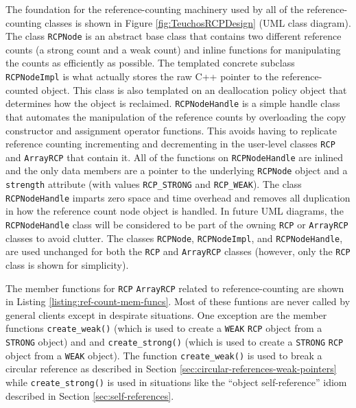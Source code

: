 \documentclass[pdf,ps2pdf,11pt]{SANDreport}
\begin{document}
The foundation for the reference-counting machinery used by all of the
reference-counting classes is shown in Figure
{}\ref{fig:TeuchosRCPDesign} (UML class diagram).  The class
{}\texttt{RCPNode} is an abstract base class that contains two
different reference counts (a strong count and a weak count) and
inline functions for manipulating the counts as efficiently as
possible.  The templated concrete subclass {}\texttt{RCPNodeImpl} is
what actually stores the raw C++ pointer to the reference-counted
object.  This class is also templated on an deallocation policy object
that determines how the object is reclaimed.  {}\texttt{RCPNodeHandle}
is a simple handle class that automates the manipulation of the
reference counts by overloading the copy constructor and assignment
operator functions.  This avoids having to replicate reference
counting incrementing and decrementing in the user-level classes
{}\texttt{RCP} and {}\texttt{ArrayRCP} that contain it.  All of the
functions on {}\texttt{RCPNodeHandle} are inlined and the only data
members are a pointer to the underlying {}\texttt{RCPNode} object and
a {}\texttt{strength} attribute (with values {}\texttt{RCP\_STRONG}
and {}\texttt{RCP\_WEAK}).  The class {}\texttt{RCPNodeHandle} imparts
zero space and time overhead and removes all duplication in how the
reference count node object is handled.  In future UML diagrams, the
{}\texttt{RCPNodeHandle} class will be considered to be part of the
owning {}\texttt{RCP} or {}\texttt{ArrayRCP} classes to avoid clutter.
The classes {}\texttt{RCPNode}, {}\texttt{RCPNodeImpl}, and
{}\texttt{RCPNodeHandle}, are used unchanged for both the
{}\texttt{RCP} and {}\texttt{ArrayRCP} classes (however, only the
{}\texttt{RCP} class is shown for simplicity).

The member functions for {}\texttt{RCP} {}\texttt{ArrayRCP} related to
reference-counting are shown in Listing
{}\ref{listing:ref-count-mem-funcs}.  Most of these funtions are never
called by general clients except in despirate situations.  One
exception are the member functions {}\texttt{create\_weak()} (which is
used to create a {}\texttt{WEAK} {}\texttt{RCP} object from a
{}\texttt{STRONG} object) and and {}\texttt{create\_strong()} (which
is used to create a {}\texttt{STRONG} {}\texttt{RCP} object from a
{}\texttt{WEAK} object).  The function {}\texttt{create\_weak()} is
used to break a circular reference as described in Section
{}\ref{sec:circular-references-weak-pointers} while
{}\texttt{create\_strong()} is used in situations like the ``object
self-reference'' idiom described in Section
{}\ref{sec:self-references}.
\end{document}
